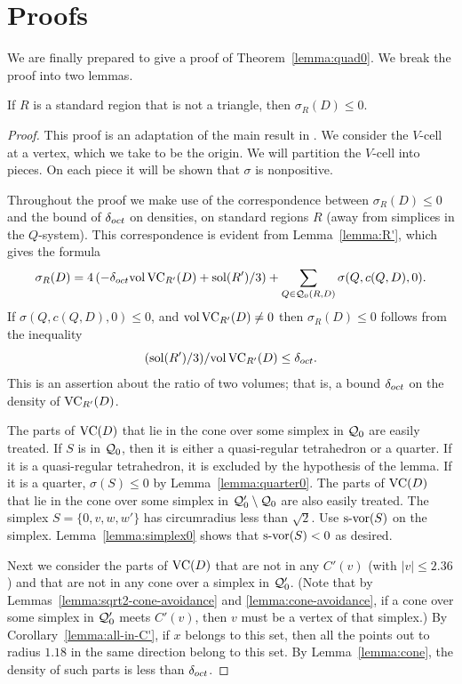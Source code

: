 \section{Proofs}
\label{sec:proofs}

We are finally prepared to give a proof of
Theorem~\ref{lemma:quad0}.  We break the proof into two lemmas.

\begin{lemma} If $R$ is a standard region that is not a triangle,
then $\sigma_R(D)\le 0$.
\end{lemma}

\begin{proof}
This proof is an adaptation of the main result in
\cite[Theorem~4.1]{part2}. We consider the $V$-cell at a vertex,
which we take to be the origin.  We will partition the $V$-cell into
pieces.  On each piece it will be shown that $\sigma$ is
nonpositive.

Throughout the proof we make use of the correspondence between
$\sigma_R(D)\le0$ and the bound of $\delta_{oct}$ on densities, on
standard regions $R$ (away from  simplices in the $Q$-system).
This correspondence is evident from Lemma~\ref{lemma:R'}, which
gives the formula
   $$
   \sigma_R(D) = 4\left(-\delta_{oct} {\operatorname{vol}}\,{\operatorname{VC}}_{R'}(D) +
      \operatorname{sol}(R')/3\right)
      + \sum_{Q\in{\mathcal Q}_0(R,D)} \sigma(Q,c(Q,D),0).
   $$
If $\sigma(Q,c(Q,D),0)\le0$, and ${\operatorname{vol}}\,{\operatorname{VC}}_{R'}(D)\ne0$
then $\sigma_R(D)\le0$ follows from the inequality
   $$
      (\operatorname{sol}(R')/3)/{\operatorname{vol}}\,{\operatorname{VC}}_{R'}(D) \le \delta_{oct}.
   $$
This is an assertion about the ratio of two volumes; that is, a
bound $\delta_{oct}$ on the density of ${\operatorname{VC}}_{R'}(D)$.

The parts of ${\operatorname{VC}}(D)$ that lie in the cone over some simplex
in ${\mathcal Q}_0$ are easily treated.  If $S$ is in ${\mathcal Q}_0$, then it
is either a quasi-regular tetrahedron or a quarter.  If it is a
quasi-regular tetrahedron, it is excluded by the hypothesis of the
lemma.  If it is a quarter, $\sigma(S)\le0$ by
Lemma~\ref{lemma:quarter0}. The parts of ${\operatorname{VC}}(D)$ that lie in
the cone over some simplex in ${\mathcal Q}_0'\setminus{\mathcal Q}_0$ are also
easily treated. The simplex $S=\{0,v,w,w'\}$ has circumradius less
than $\sqrt2$.  Use $\operatorname{s-vor}(S)$ on the simplex.
Lemma~\ref{lemma:simplex0} shows that $\operatorname{s-vor}(S)<0$ as desired.

Next we consider the parts of ${\operatorname{VC}}(D)$ that are not in any
$C'(v)$ (with $|v|\le2.36$) and that are not in any cone over a
simplex in ${\mathcal Q}'_0$. (Note that by
Lemmas~\ref{lemma:sqrt2-cone-avoidance} and
\ref{lemma:cone-avoidance}, if a cone over some simplex in
${\mathcal Q}'_0$ meets $C'(v)$, then $v$ must be a vertex of that
simplex.)  By Corollary~\ref{lemma:all-in-C'}, if $x$ belongs to
this set, then all the points out to radius $1.18$ in the same
direction belong to this set.  By Lemma~\ref{lemma:cone}, the
density of such parts is less than $\delta_{oct}$.


\end{proof}
